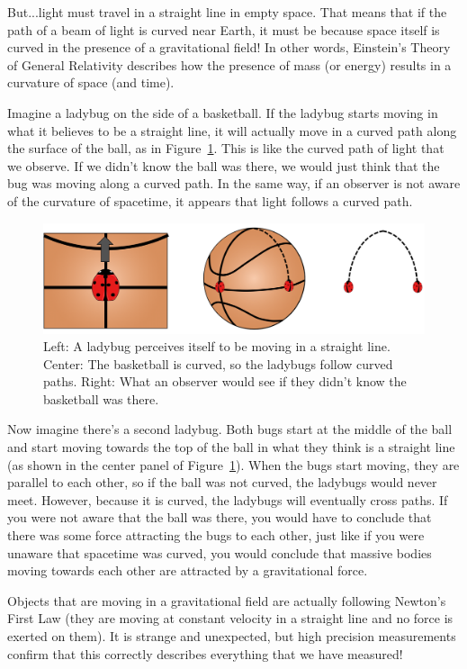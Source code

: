 But...light must travel in a straight line in empty space. That means that if the path of a beam of light is curved near Earth, it must be because space itself is curved in the presence of a gravitational field! In other words, Einstein's Theory of General Relativity describes how the presence of mass (or energy) results in a curvature of space (and time).

Imagine a ladybug on the side of a basketball. If the ladybug starts moving in what it believes to be a straight line, it will actually move in a curved path along the surface of the ball, as in Figure~\ref{fig:gravity:ladybug}. This is like the curved path of light that we observe. If we didn't know the ball was there, we would just think that the bug was moving along a curved path. In the same way, if an observer is not aware of the curvature of spacetime, it appears that light follows a curved path.

\begin{figure}[!htbp]
\centering
\includegraphics[width=0.8\linewidth]{files/ladybuganalogy-ceee73126e2939c41982b3bdb610b1d2.png}
\caption[]{Left: A ladybug perceives itself to be moving in a straight line. Center: The basketball is curved, so the ladybugs follow curved paths. Right: What an observer would see if they didn't know the basketball was there.}
\label{fig:gravity:ladybug}
\end{figure}

Now imagine there's a second ladybug. Both bugs start at the middle of the ball and start moving towards the top of the ball in what they think is a straight line (as shown in the center panel of Figure~\ref{fig:gravity:ladybug}). When the bugs start moving, they are parallel to each other, so if the ball was not curved, the ladybugs would never meet. However, because it is curved, the ladybugs will eventually cross paths. If you were not aware that the ball was there, you would have to conclude that there was some force attracting the bugs to each other, just like if you were unaware that spacetime was curved, you would conclude that massive bodies moving towards each other are attracted by a gravitational force.

Objects that are moving in a gravitational field are actually following Newton's First Law (they are moving at constant velocity in a straight line and no force is exerted on them). It is strange and unexpected, but high precision measurements confirm that this correctly describes everything that we have measured!

